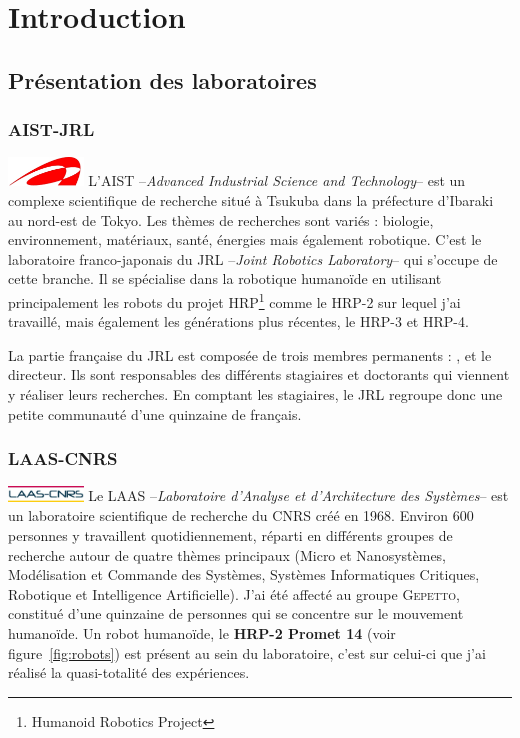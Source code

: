 \section{Introduction}
\label{sec:intro}

\subsection{Présentation des laboratoires}
\label{sub:labo}

\subsubsection{AIST-JRL}
\label{sub:JRL}

\includegraphics[width=2.0cm]{images/Logo-AIST-only.jpg}
L'AIST --\emph{Advanced Industrial Science and Technology}-- est un complexe scientifique de recherche situé à Tsukuba dans la préfecture d'Ibaraki au nord-est de Tokyo. Les thèmes de recherches sont variés : biologie, environnement, matériaux, santé, énergies mais également robotique. C'est le laboratoire franco-japonais du JRL --\emph{Joint Robotics Laboratory}-- qui s'occupe de cette branche. Il se spécialise dans la robotique humanoïde en utilisant principalement les robots du projet HRP\footnote{Humanoid Robotics Project} comme le HRP-2 sur lequel j'ai travaillé, mais également les générations plus récentes, le HRP-3 et HRP-4.

La partie française du JRL est composée de trois membres permanents : \olivier, \eiichi et \abder le directeur. Ils sont responsables des différents stagiaires et doctorants qui viennent y réaliser leurs recherches. En comptant les stagiaires, le JRL regroupe donc une petite communauté d'une quinzaine de français.

\subsubsection{LAAS-CNRS}
\label{sub:LAAS}

\includegraphics[width=2.0cm]{images/Logo-LAAS-CNRS.jpg}
Le LAAS --\emph{Laboratoire d'Analyse et d'Architecture des Systèmes}-- est un laboratoire scientifique de recherche du CNRS créé en 1968. Environ 600 personnes y travaillent quotidiennement, réparti en différents groupes de recherche autour de quatre thèmes principaux (Micro et Nanosystèmes, Modélisation et Commande des Systèmes, Systèmes Informatiques Critiques, Robotique et Intelligence Artificielle). J'ai été affecté au groupe G\textsc{epetto}, constitué d'une quinzaine de personnes qui se concentre sur le mouvement humanoïde. 
Un robot humanoïde, le \textbf{HRP-2 Promet 14} (voir figure~\ref{fig:robots}) est présent au sein du laboratoire, c'est sur celui-ci que j'ai réalisé la quasi-totalité des expériences.

